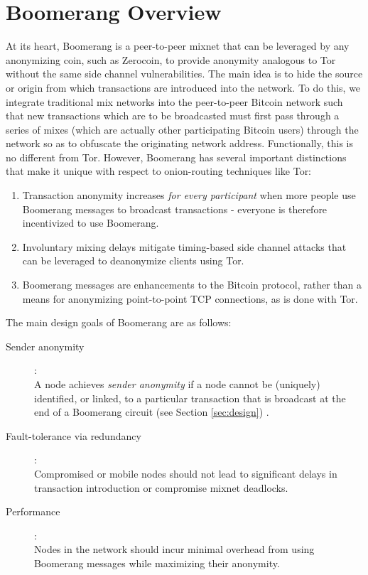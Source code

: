 \section{Boomerang Overview}
At its heart, Boomerang is a peer-to-peer mixnet that can be leveraged by any anonymizing coin, such as Zerocoin, to provide anonymity analogous to Tor without the same side channel vulnerabilities. The main idea is to hide the source or origin from which transactions are introduced into the network. To do this, we integrate traditional mix networks into the peer-to-peer Bitcoin network such that new transactions which are to be broadcasted must first pass through a series of mixes (which are actually other participating Bitcoin users) through the network so as to obfuscate the originating network address. Functionally, this is no different from Tor. However, Boomerang has several important distinctions that make it unique with respect to onion-routing techniques like Tor:
\begin{enumerate}
	\item Transaction anonymity increases \emph{for every participant} when more people use Boomerang messages to broadcast transactions - everyone is therefore incentivized to use Boomerang. 
	\item Involuntary mixing delays mitigate timing-based side channel attacks that can be leveraged to deanonymize clients using Tor. 
	\item Boomerang messages are enhancements to the Bitcoin protocol, rather than a means for anonymizing point-to-point TCP connections, as is done with Tor. 
\end{enumerate}

The main design goals of Boomerang are as follows:
\begin{description}
	\item[Sender anonymity]: \\A node achieves \emph{sender anonymity} if a node cannot be (uniquely) identified, or linked, to a particular transaction that is broadcast at the end of a Boomerang circuit (see Section \ref{sec:design}) \cite{AnonymityTerms}. 
	\item[Fault-tolerance via redundancy]: \\Compromised or mobile nodes should not lead to significant delays in transaction introduction or compromise mixnet deadlocks.
	\item[Performance]: \\Nodes in the network should incur minimal overhead from using Boomerang messages while maximizing their anonymity.
\end{description}

